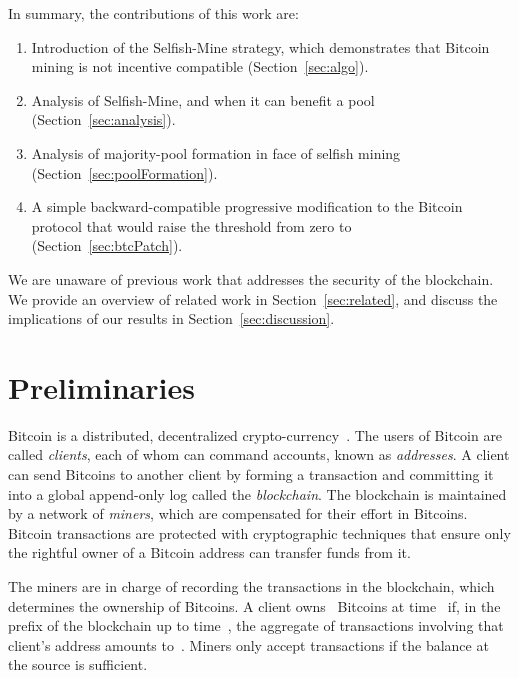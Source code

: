 \documentclass[letterpaper]{llncs}
\newcommand{\negspace}{\vspace{-0.5\baselineskip}}
\begin{document}
In summary, the contributions of this work are: 
\begin{enumerate} 
\item Introduction of the Selfish-Mine strategy, which demonstrates that Bitcoin mining is not incentive compatible (Section~\ref{sec:algo}). 

\item Analysis of Selfish-Mine, and when it can benefit a pool (Section~\ref{sec:analysis}). 

\item Analysis of majority-pool formation in face of selfish mining (Section~\ref{sec:poolFormation}). 

\item A simple backward-compatible progressive modification to the Bitcoin protocol that would raise the threshold from zero to~ (Section~\ref{sec:btcPatch}). 
\end{enumerate} 

We are unaware of previous work that addresses the security of the blockchain. We provide an overview of related work in Section~\ref{sec:related}, and discuss the implications of our results in Section~\ref{sec:discussion}. 



    \section{Preliminaries} \label{sec:prelim} 
\negspace

Bitcoin is a distributed, decentralized crypto-currency~\cite{bitcoin2013protocol,bitcoin2013rules,nakamoto2008bitcoin,bitcoin2013source}. 
The users of Bitcoin are called \emph{clients}, each of whom can command accounts, known as \emph{addresses}. A client can send Bitcoins to another client by forming a transaction and committing it into a global append-only log called the \emph{blockchain}. The blockchain is maintained by a network of \emph{miners}, which are compensated for their effort in Bitcoins. Bitcoin transactions are protected with cryptographic techniques that ensure only the rightful owner of a Bitcoin address can transfer funds from it. 

The miners are in charge of recording the transactions in the blockchain, which determines the ownership of Bitcoins. 
A client owns~ Bitcoins at time~ if, in the prefix of the blockchain up to time~, the aggregate of transactions involving that client's address amounts to~. 
Miners only accept transactions if the balance at the source is sufficient. 
\end{document}
